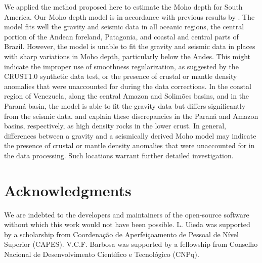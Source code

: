 We applied the method proposed here to estimate the Moho depth for South
America.
Our Moho depth model is in accordance with previous results by
\citet{vandermeijde2013}.
The model fits well the gravity and seismic data in all oceanic regions, the
central portion of the Andean foreland, Patagonia, and coastal and central
parts of Brazil.
However, the model is unable to fit the gravity and seismic data in places with
sharp variations in Moho depth, particularly below the Andes.
This might indicate the improper use of smoothness regularization, as suggested
by the CRUST1.0 synthetic data test, or the presence of crustal or mantle
density anomalies that were unaccounted for during the data corrections.
In the coastal region of Venezuela, along the central Amazon and Solimões
basins, and in the Paraná basin, the model is able to fit the gravity data but
differs significantly from the seismic data.
\citet{mariani2013} and \citet{nunn1988} explain these discrepancies in the
Paraná and Amazon basins, respectively, as high density rocks in the lower
crust.
In general, differences between a gravity and a seismically derived Moho model
may indicate the presence of crustal or mantle density anomalies that were
unaccounted for in the data processing.
Such locations warrant further detailed investigation.



\section{Acknowledgments}

We are indebted to the developers and maintainers of the open-source
software without which this work would not have been possible.
L. Uieda was supported by a scholarship from
Coordenação de Aperfeiçoamento de Pessoal de Nível Superior
(CAPES).
V.C.F. Barbosa was supported by a fellowship from
Conselho Nacional de Desenvolvimento Científico e Tecnológico (CNPq).
